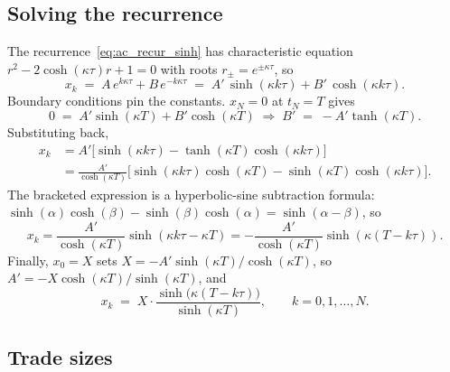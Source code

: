 \subsection{Solving the recurrence}
\label{subsec:ac_solve_recur}

The recurrence~\eqref{eq:ac_recur_sinh} has characteristic equation
$r^2 - 2\cosh(\kappa\tau) r + 1 = 0$ with roots $r_{\pm} =
e^{\pm\kappa\tau}$, so
\begin{equation*}
  x_k \;=\; A\,e^{k\kappa\tau} + B\,e^{-k\kappa\tau}
       \;=\; A'\,\sinh(\kappa k\tau) + B'\,\cosh(\kappa k\tau).
\end{equation*}
Boundary conditions pin the constants. $x_N = 0$ at $t_N = T$ gives
\begin{equation*}
  0 \;=\; A'\sinh(\kappa T) + B'\cosh(\kappa T)
  \;\Rightarrow\;
  B' \;=\; -A'\tanh(\kappa T).
\end{equation*}
Substituting back,
\begin{align*}
  x_k &= A'\bigl[\sinh(\kappa k\tau) - \tanh(\kappa T)\cosh(\kappa k\tau)\bigr] \\
      &= \frac{A'}{\cosh(\kappa T)}\bigl[\sinh(\kappa k\tau)\cosh(\kappa T) - \sinh(\kappa T)\cosh(\kappa k\tau)\bigr].
\end{align*}
The bracketed expression is a hyperbolic-sine subtraction formula:
$\sinh(\alpha)\cosh(\beta) - \sinh(\beta)\cosh(\alpha) = \sinh(\alpha -
\beta)$, so
\begin{equation*}
  x_k = \frac{A'}{\cosh(\kappa T)}\sinh(\kappa k\tau - \kappa T)
       = -\frac{A'}{\cosh(\kappa T)}\sinh(\kappa(T - k\tau)).
\end{equation*}
Finally, $x_0 = X$ sets $X = -A'\sinh(\kappa T)/\cosh(\kappa T)$, so
$A' = -X\cosh(\kappa T)/\sinh(\kappa T)$, and
\begin{equation}
  \boxed{\;
  x_k \;=\; X \cdot \frac{\sinh\!\bigl(\kappa(T - k\tau)\bigr)}{\sinh(\kappa T)},
  \qquad k = 0, 1, \ldots, N.
  \;}
  \label{eq:ac_xstar}
\end{equation}

\subsection{Trade sizes}
\label{subsec:ac_nstar}

